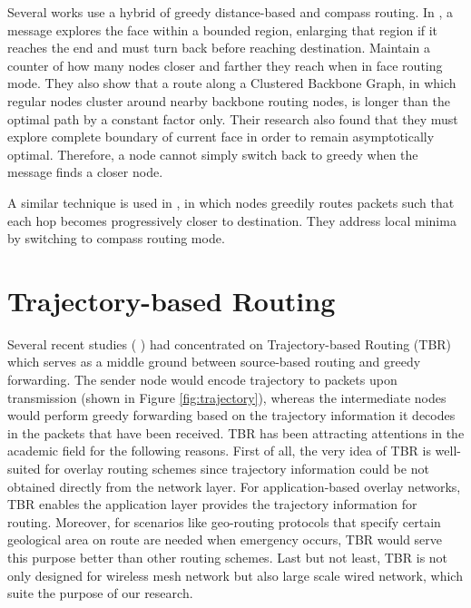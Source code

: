 \documentclass[conference]{IEEEtran}
\begin{document}
Several works use a hybrid of greedy distance-based and compass routing.
In \cite{Kuhn2003}, a message explores the face within a bounded region, enlarging that region if it reaches the end and must turn back before reaching destination.
Maintain a counter of how many nodes closer and farther they reach when in face routing mode.
They also show that a route along a Clustered Backbone Graph, in which regular nodes cluster around nearby backbone routing nodes, is longer than the optimal path by a constant factor only.
Their research also found that they must explore complete boundary of current face in order to remain asymptotically optimal.
Therefore, a node cannot simply switch back to greedy when the message finds a closer node.

A similar technique is used in \cite{Karp2000}, in which nodes greedily routes packets such that each hop becomes progressively closer to destination.
They address local minima by switching to compass routing mode.


\section{Trajectory-based Routing}

Several recent studies ( \cite{Niculescu2003} \cite{Niculescu2004} \cite{Yuksel2006} ) had concentrated on Trajectory-based Routing (TBR) which serves as a middle ground between source-based routing and greedy forwarding. The sender node would encode trajectory to packets upon transmission (shown in Figure \ref{fig:trajectory}), whereas the intermediate nodes would perform greedy forwarding based on the trajectory information it decodes in the 
packets that have been received. TBR has been attracting attentions in the academic field for the following reasons. First of all, the very idea of TBR is well-suited for overlay routing schemes since trajectory information could be not obtained directly from the network layer. For application-based overlay networks, TBR enables
the application layer provides the trajectory information for routing. Moreover, for scenarios like geo-routing protocols that specify certain geological area on route are needed when emergency occurs, TBR would serve this purpose better than other routing schemes. Last but not least, TBR is not only designed for wireless mesh network but also 
large scale wired network, which suite the purpose of our research.
\end{document}
